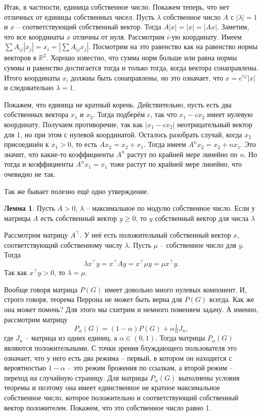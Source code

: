 \documentclass[10pt,a4paper,oneside]{book}
\theoremstyle{definition}
\newtheorem{lem}{\color{green!50!black}Лемма}
\renewcommand{\geq}{\geqslant}
\newcommand{\mb}[1]{\mathbb{#1}}
\def\ffi{\varphi}
\def\lm{\begin{lem}}
\def\elm{\end{lem}}
\begin{document}
Итак, в частности, единица собственное число. Покажем теперь, что нет отличных от единицы собственных чисел. Пусть $\lambda$ собственное число $A$ с $|\lambda|=1$ и $x$ -- соответствующий собственный вектор. Тогда $A|x|=|x|=|Ax|$. Заметим, что все координаты $x$ отличны от нуля. Рассмотрим $i$-ую координату. Имеем $\sum A_{ij}|x_j|=x_i=|\sum A_{ij}x_j|$. Посмотрим на это равенство как на равенство нормы векторов в $\mb R^2$. Хорошо известно, что сумма норм больше или равна нормы суммы и равенство достигается тогда и только тогда, когда вектора сонаправлены. Итого координаты $x_i$ должны быть сонаправлены, но это означает, что $x=e^{i\ffi} |x|$ и следовательно $\lambda=1$. 

Покажем, что единица не кратный корень. Действительно, пусть есть два собственных вектора $x_1$ и $x_2$. Тогда подберём $c$, так что $x_1-cx_2$ имеет нулевую координату. Получаем противоречие, так как $|x_1-cx_2|$ неотрицательный вектор для 1, но при этом с нулевой координатой. Осталось разобрать случай, когда $x_2$ присоединён к $x_1>0$, то есть $Ax_2=x_2+x_1$. Тогда имеем $A^nx_2=x_2 +nx_1$. Это значит, что какие-то коэффициенты $A^n$ растут по крайней мере линейно по $n$. Но тогда и коэффициенты $A^nx_1=x_1$ тоже растут по крайней мере линейно, что очевидно не так.
\endproof

Так же бывает полезно ещё одно утверждение. 
\lm Пусть $A>0$, $\lambda$ -- максимальное по модулю собственное число. Если у матрицы $A$ есть собственный вектор $y\geq 0$, то $y$ собственный вектор для числа $\lambda$
\elm
\proof Рассмотрим матрицу $A^{\top}$. У неё есть положительный  собственный вектор $x$, соответствующий собственному числу $\lambda$. Пусть $\mu$ -- собственное число для $y$. Тогда 
$$\lambda x^{\top}y= x^{\top}Ay=x^{\top}\mu y=\mu x^{\top}y.$$
Так как $x^{\top}y >0$, то $\lambda=\mu$.
\endproof


Вообще говоря матрица $P(G)$ имеет довольно много нулевых компонент. И, строго говоря, теорема Перрона не может быть верна для $P(G)$ всегда. Как же она может помочь? Для этого мы схитрим и немного поменяем задачу. А именно, рассмотрим матрицу $$P_{\alpha}(G)=(1-\alpha) P(G) + \alpha\tfrac{1}{n}J_n,$$
где $J_n$ -- матрица из одних единиц, а $\alpha \in (0,1)$. Тогда матрицы $P_{\alpha}(G)$ являются положительными. С точки зрения блуждающего пользователя это означает, что у него есть два режима -- первый, в котором он находится с вероятностью $1-\alpha$ -- это режим брожения по ссылкам, а второй режим -- переход на случайную страницу. Для матрицы $P_{\alpha}(G)$ выполнены условия теоремы и поэтому она имеет единственное не кратное максимальное собственное число, которое положительно и соответствующий собственный вектор положителен. Покажем, что это собственное число равно 1.
\end{document}
